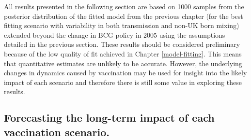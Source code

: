 \documentclass[11pt,twoside]{bristolthesis}
\begin{document}
  All results presented in the following section are based on 1000 samples from the posterior distribution of the fitted model from the previous chapter (for the best fitting scenario with variability in both transmission and non-UK born mixing) extended beyond the change in BCG policy in 2005 using the assumptions detailed in the previous section. These results should be considered preliminary because of the low quality of fit achieved in Chapter \ref{model-fitting}. This means that quantitative estimates are unlikely to be accurate. However, the underlying changes in dynamics caused by vaccination may be used for insight into the likely impact of each scenario and therefore there is still some value in exploring these results.
  
  \hypertarget{forecasting-the-long-term-impact-of-each-vaccination-scenario.}{%
  \subsection{Forecasting the long-term impact of each vaccination scenario.}\label{forecasting-the-long-term-impact-of-each-vaccination-scenario.}}
  
\end{document}
